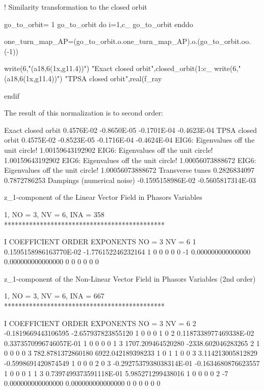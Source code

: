 \documentclass{hitec}     %
\begin{document}
{{{{{{\begin{code}
! Similarity transformation to the closed orbit
 
go_to_orbit= 1
go_to_orbit%
do i=1,c_%
 go_to_orbit%
enddo
 
one_turn_map_AP=(go_to_orbit.o.one_turn_map_AP).o.(go_to_orbit.oo.(-1))

 write(6,"(a18,6(1x,g11.4))") "Exact closed orbit",closed_orbit(1:c_%
 write(6,"(a18,6(1x,g11.4))") "TPSA  closed orbit",real(f_ray%

endif
 
\end{code}

The result of this normalization  is to second order:
 
\begin{code}
Exact closed orbit  0.4576E-02 -0.8650E-05 -0.1701E-04 -0.4623E-04
TPSA  closed orbit  0.4575E-02 -0.8523E-05 -0.1716E-04 -0.4624E-04
  EIG6: Eigenvalues off the unit circle!
   1.00159643192902
  EIG6: Eigenvalues off the unit circle!
   1.00159643192902
  EIG6: Eigenvalues off the unit circle!
   1.00056073888672
  EIG6: Eigenvalues off the unit circle!
   1.00056073888672
 Transverse tunes
  0.2826834097       0.7872786253
 Dampings (numerical noise)
 -0.1595158986E-02  -0.5605817314E-03

 z_1-component of the Linear Vector Field in Phasors Variables

          1, NO =    3, NV =    6, INA =  358
 *********************************************

    I  COEFFICIENT          ORDER   EXPONENTS
      NO =     3      NV =     6
   1  0.1595158986163770E-02  -1.776152246232164       1  0  0  0  0  0
    -1   0.000000000000000       0.000000000000000       0  0  0  0  0  0

 z_1-component of the Non-Linear Vector Field in Phasors Variables (2nd order)

          1, NO =    3, NV =    6, INA =  667
 *********************************************

    I  COEFFICIENT          ORDER   EXPONENTS
      NO =     3      NV =     6
   2 -0.1819669443106595      -2.657937823855120       1  0  0  0  1  0
   2  0.1187338977469338E-02  0.3373570996746057E-01   1  0  0  0  0  1
   3   1707.209464520280      -2338.602046283265       2  1  0  0  0  0
   3   782.8781372860180       6922.042189398233       1  0  1  1  0  0
   3   3.114213005812829     -0.5998691420874549       1  0  0  0  2  0
   3 -0.2927537938038314E-01 -0.1634680876623557       1  0  0  0  1  1
   3  0.7397499373591118E-01   5.985271299438016       1  0  0  0  0  2
    -7   0.000000000000000       0.000000000000000       0  0  0  0  0  0
\end{code}

}}}}}}
\end{document}

